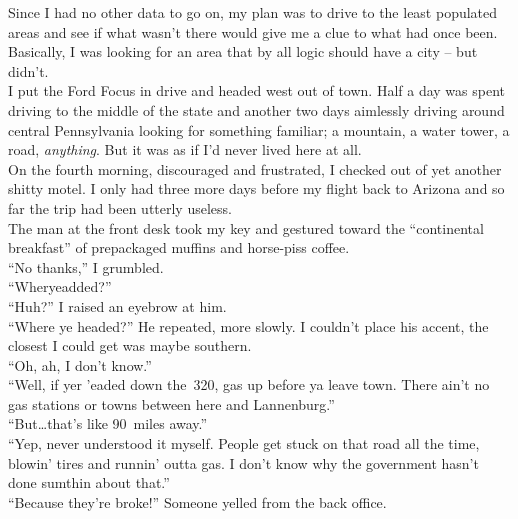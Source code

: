 \documentclass[a5paper]{scrartcl}
\begin{document}
Since I had no other data to go on, my plan was to drive to the least populated areas and see if what wasn't there would give me a clue to what had once been. Basically, I was looking for an area that by all logic should have a city -- but didn't.\\


I put the Ford Focus in drive and headed west out of town.
Half a day was spent driving to the middle of the state and another two days aimlessly driving around central Pennsylvania looking for something familiar; a mountain, a water tower, a road, \textit{anything}. But it was as if I'd never lived here at all.\\


On the fourth morning, discouraged and frustrated, I checked out of yet another shitty motel. I only had three more days before my flight back to Arizona and so far the trip had been utterly useless.\\


The man at the front desk took my key and gestured toward the \enquote{continental breakfast} of prepackaged muffins and 
horse-piss coffee.\\


\enquote{No thanks,} I grumbled.\\


\enquote{Wheryeadded?}\\


\enquote{Huh?} I raised an eyebrow at him.\\


\enquote{Where ye headed?} He repeated, more slowly. I couldn't place his accent, the closest I could get was maybe southern.\\


\enquote{Oh, ah, I don't know.}\\


\enquote{Well, if yer 'eaded down the~320, gas up before ya leave town. There ain't no gas stations or towns between here and Lannenburg.}\\


\enquote{But\dots that's like 90~miles away.}\\


\enquote{Yep, never understood it myself. People get stuck on that road all the time, blowin' tires and runnin' outta gas. I don't know why the government hasn't done sumthin about that.}\\


\enquote{Because they're broke!} Someone yelled from the back office.\\
\end{document}

